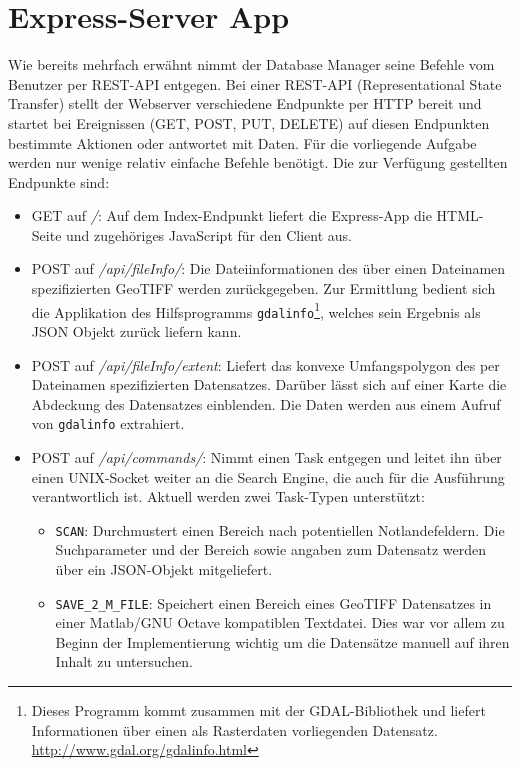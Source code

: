 \documentclass[10pt,a4paper]{report}
\begin{document}
\section{Express-Server App}

Wie bereits mehrfach erwähnt nimmt der Database Manager seine Befehle vom Benutzer per REST-API entgegen. Bei einer REST-API (Representational State Transfer) stellt der Webserver verschiedene Endpunkte per HTTP bereit und startet bei Ereignissen (GET, POST, PUT, DELETE) auf diesen Endpunkten bestimmte Aktionen oder antwortet mit Daten. Für die vorliegende Aufgabe werden nur wenige relativ einfache Befehle benötigt. Die zur Verfügung gestellten Endpunkte sind:

\begin{itemize}
	\item GET auf \emph{/}: Auf dem Index-Endpunkt liefert die Express-App die HTML-Seite und zugehöriges JavaScript für den Client aus.
	\item POST auf \emph{/api/fileInfo/}: Die Dateiinformationen des über einen Dateinamen spezifizierten GeoTIFF werden zurückgegeben. Zur Ermittlung bedient sich die Applikation des Hilfsprogramms \texttt{gdalinfo}\footnote{Dieses Programm kommt zusammen mit der GDAL-Bibliothek und liefert Informationen über einen als Rasterdaten vorliegenden Datensatz. \href{http://www.gdal.org/gdalinfo.html}{http://www.gdal.org/gdalinfo.html}}, welches sein Ergebnis als JSON Objekt zurück liefern kann.
	\item POST auf \emph{/api/fileInfo/extent}: Liefert das konvexe Umfangspolygon des per Datei\-namen spezifizierten Datensatzes. Darüber lässt sich auf einer Karte die Abdeckung des Datensatzes einblenden. Die Daten werden aus einem Aufruf von \texttt{gdalinfo} extrahiert.
	\item POST auf \emph{/api/commands/}: Nimmt einen Task entgegen und leitet ihn über einen UNIX-Socket weiter an die Search Engine, die auch für die Ausführung verantwortlich ist. Aktuell werden zwei Task-Typen unterstützt:
	\begin{itemize}
		\item \texttt{SCAN}: Durchmustert einen Bereich nach potentiellen Notlandefeldern. Die Suchparameter und der Bereich sowie angaben zum Datensatz werden über ein JSON-Objekt mitgeliefert.
		\item \texttt{SAVE\_2\_M\_FILE}: Speichert einen Bereich eines GeoTIFF Datensatzes in einer Matlab/GNU Octave kompatiblen Textdatei. Dies war vor allem zu Beginn der Implementierung wichtig um die Datensätze manuell auf ihren Inhalt zu untersuchen.

\end{itemize}
\end{itemize}
\end{document}

